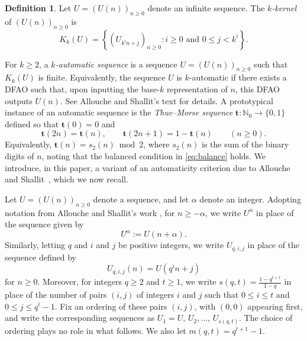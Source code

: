 \documentclass[12pt,reqno]{article}
\theoremstyle{plain}
\theoremstyle{definition}
\newtheorem{definition}[theorem]{Definition}
\theoremstyle{remark}
\begin{document}
\begin{definition} 
 Let $U = (U(n))_{n \geq 0}$ denote an infinite sequence. The \emph{$k$-kernel} of $(U(n))_{n \geq 0}$ \cite[p.\ 185]{AlloucheShallit2003} is 
 $$ K_{k}(U) = \left\{ \left( U_{k^{i}n+j} \right)_{n \geq 0} : \text{$i \geq 0$ and $0 \leq j < k^{i}$} \right\}. $$ 
\end{definition} 

 For $k \geq 2$, a \emph{$k$-automatic sequence} is a sequence $U = (U(n))_{n \geq 0}$ such that $K_{k}(U)$ is finite. Equivalently,
 the sequence $U$ is 
 $k$-automatic if there exists a DFAO such that, upon inputting the base-$k$ representation of $n$, this DFAO outputs $U(n)$. See 
 Allouche and Shallit's text \cite{AlloucheShallit2003} for details. A prototypical instance of an automatic sequence is the 
 \emph{Thue--Morse sequence} $\mathbf{t}:\mathbb{N}_0\to\{0,1\}$ defined so that $\mathbf{t}(0)=0$ and $$ \mathbf{t}(2n) = 
 \mathbf{t}(n),\qquad \mathbf{t}(2 n + 1) = 1 - \mathbf{t}(n)\qquad (n\ge 0). $$ 
 Equivalently, $\mathbf{t}(n)=s_2(n)\bmod 2$, where $s_2(n)$ is the sum of the binary digits of $n$, 
 noting that the balanced condition in \eqref{eq:balance} holds. 
 We introduce, in this paper, a variant of 
 an automaticity criterion due to Allouche and Shallit~\cite{AlloucheShallit2012}, which we now recall.

 Let $U = (U(n))_{n \geq 0}$ denote a sequence, and let $\alpha$ denote an integer. Adopting notation from Allouche and Shallit's work 
 \cite{AlloucheShallit2012}, for $n \geq -\alpha$, we write $U^{\alpha}$ in place of the sequence given by 
 $$ U^{\alpha} := U(n + \alpha). $$ Similarly, letting $q$ and $i$ and $j$ be positive integers, 
 we write $U_{q, i, j}$ in place of the sequence defined by 
\begin{equation}\label{Utriple} 
 U_{q, i, j}(n) = U\left( q^{i} n + j \right) 
\end{equation}
 for $n \geq 0$. Moreover, for integers $q \geq 2$ and $t \geq 1$, we write $s(q, t) = \frac{1-q^{t+1}}{1-q}$ in place of the number of 
 pairs $(i, j)$ of integers $i$ and $j$ such that $0 \leq i \leq t$ and $0 \leq j \leq q^{i} - 1$. Fix an ordering of these pairs $(i,j)$, with $(0, 
 0)$ appearing first, and write the corresponding sequences as
 $U_1=U,\,U_2,\ldots,\,U_{s(q,t)}$. The choice of ordering plays no role in what follows. 
 We also let $m(q, t) = q^{t+1} - 1$.
\end{document}

